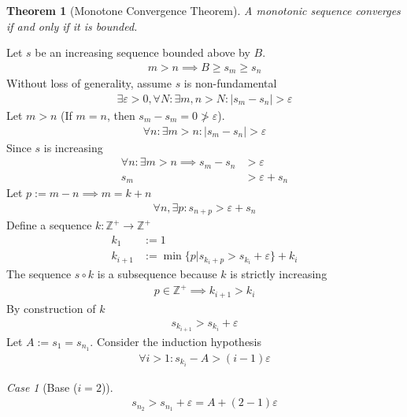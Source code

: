 \documentclass{amsart}
\numberwithin{equation}{section}
\let\oldendproof\endproof
\renewenvironment{proof}[1][\proofname]{%
  \setcounter{case}{0}
  \setcounter{step}{0}
  \oldproof[#1]%
}{\oldendproof}
\theoremstyle{plain}
\newtheorem{theorem}{Theorem}[section]
\theoremstyle{definition}
\theoremstyle{remark}
\newtheorem{case}{Case}
\begin{document}
\begin{theorem}[Monotone Convergence Theorem]
  A monotonic sequence converges if and only if it is bounded.
\end{theorem}
\begin{proof}
  Let $s$ be an increasing sequence bounded above by $B$.
  \begin{align}
    m>n \implies B\geq s_m \geq s_n
  \end{align}
  Without loss of generality, assume $s$ is non-fundamental
  \begin{align}
    \exists \varepsilon>0, \forall N: \exists m,n> N: |s_m - s_n | > \varepsilon
  \end{align}
  Let $m>n$ (If $m=n$, then $s_m-s_m = 0\ngtr \varepsilon$).
  \begin{align}
    \forall n: \exists m> n: |s_m - s_n | > \varepsilon
  \end{align}
  Since $s$ is increasing
  \begin{align}
    \forall n: \exists m> n \implies s_m - s_n&> \varepsilon\\ 
    s_m &> \varepsilon + s_n
  \end{align}
  Let $p:= m-n \implies m= k+n$
  \begin{align}
    \forall n, \exists p: s_{n+p} > \varepsilon + s_n
  \end{align}
  Define a sequence $k:\mathbb{Z}^+\to \mathbb{Z}^+$
  \begin{align}
    k_1&:=1\\
    k_{i+1}&:= \min\{p | s_{k_i+p} > s_{k_i}+\varepsilon\} + k_i
  \end{align}
  The sequence $s\circ k$ is a subsequence because $k$ is strictly increasing
  \begin{align}
    p\in\mathbb{Z}^+ \implies k_{i+1} > k_i
  \end{align}
  By construction of $k$
  \begin{align}
    s_{k_{i+1}} > s_{k_i} + \varepsilon
  \end{align}
  Let $A:=s_1 = s_{n_1}$.
  Consider the induction hypothesis
  \begin{align}
    \forall i>1: s_{k_i} - A > (i-1) \varepsilon
  \end{align}
  \begin{case}[Base ($i=2$)]
    \begin{align}
      s_{n_{2}} > s_{n_1} + \varepsilon = A + (2-1) \varepsilon
    \end{align}
  \end{case}

\end{proof}
\end{document}
